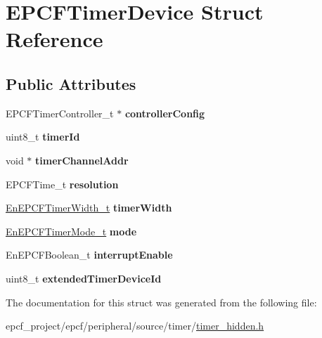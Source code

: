 \hypertarget{structEPCFTimerDevice}{}\section{E\+P\+C\+F\+Timer\+Device Struct Reference}
\label{structEPCFTimerDevice}
\subsection*{Public Attributes}
\begin{DoxyCompactItemize}
\item 
\mbox{\label{structEPCFTimerDevice_a0e8fb22b30809657de4dec6f98df72bf}} 
E\+P\+C\+F\+Timer\+Controller\+\_\+t $\ast$ {\bfseries controller\+Config}
\item 
\mbox{\label{structEPCFTimerDevice_aeb3ca6e848d75744cd97a64eead96c2b}} 
uint8\+\_\+t {\bfseries timer\+Id}
\item 
\mbox{\label{structEPCFTimerDevice_acb5678de379c17187f7b063762099b01}} 
void $\ast$ {\bfseries timer\+Channel\+Addr}
\item 
\mbox{\label{structEPCFTimerDevice_afbe621fa81d159e1835ec71868f2ea0f}} 
E\+P\+C\+F\+Time\+\_\+t {\bfseries resolution}
\item 
\mbox{\label{structEPCFTimerDevice_a5e7145654dcd20e012805db3be452030}} 
\mbox{\hyperlink{timer_8h_a88093e16b89eaa9d2df5fc6285cffa9f}{En\+E\+P\+C\+F\+Timer\+Width\+\_\+t}} {\bfseries timer\+Width}
\item 
\mbox{\label{structEPCFTimerDevice_ad3bce44004f57478e896f8c392ba2e61}} 
\mbox{\hyperlink{timer_8h_a51bff4a4babb9c83592664dca0f1f0e8}{En\+E\+P\+C\+F\+Timer\+Mode\+\_\+t}} {\bfseries mode}
\item 
\mbox{\label{structEPCFTimerDevice_af6a87697cfccb7d955acf1da71945c8f}} 
En\+E\+P\+C\+F\+Boolean\+\_\+t {\bfseries interrupt\+Enable}
\item 
\mbox{\label{structEPCFTimerDevice_adadaf9f514710ec40f8f29620c291fad}} 
uint8\+\_\+t {\bfseries extended\+Timer\+Device\+Id}
\end{DoxyCompactItemize}


The documentation for this struct was generated from the following file\+:\begin{DoxyCompactItemize}
\item 
epcf\+\_\+project/epcf/peripheral/source/timer/\mbox{\hyperlink{timer__hidden_8h}{timer\+\_\+hidden.\+h}}\end{DoxyCompactItemize}
